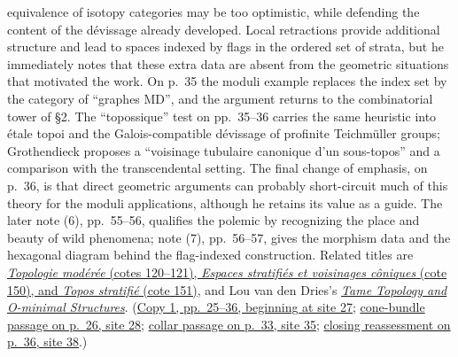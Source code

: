 equivalence of isotopy categories may be too optimistic, while defending
the content of the dévissage already developed. Local retractions provide
additional structure and lead to spaces indexed by flags in the ordered
set of strata, but he immediately notes that these extra data are absent
from the geometric situations that motivated the work. On p.~35 the
moduli example replaces the index set by the category of ``graphes MD'',
and the argument returns to the combinatorial tower of \S2. The
``topossique'' test on pp.~35--36 carries the same heuristic into étale
topoi and the Galois-compatible dévissage of profinite Teichmüller groups;
Grothendieck proposes a ``voisinage tubulaire canonique d'un sous-topos''
and a comparison with the transcendental setting. The final change of
emphasis, on p.~36, is that direct geometric arguments can probably
short-circuit much of this theory for the moduli applications, although
he retains its value as a guide. The later note (6), pp.~55--56,
qualifies the polemic by recognizing the place and beauty of wild
phenomena; note (7), pp.~56--57, gives the morphism data and the hexagonal
diagram behind the flag-indexed construction. Related titles are
\href{https://grothendieck.umontpellier.fr/archives-grothendieck/}{\emph{Topologie modérée} (cotes 120--121), \emph{Espaces stratifiés et voisinages côniques} (cote 150), and \emph{Topos stratifié} (cote 151)},
and Lou van den Dries's
\href{https://assets.cambridge.org/97805215/98385/frontmatter/9780521598385_frontmatter.pdf}{\emph{Tame Topology and O-minimal Structures}}.
(\href{https://grothendieck.umontpellier.fr/web/viewer.html?file=../119.pdf\#page=28}{Copy 1, pp.~25--36, beginning at site 27};
\href{https://grothendieck.umontpellier.fr/web/viewer.html?file=../119.pdf\#page=29}{cone-bundle passage on p.~26, site 28};
\href{https://grothendieck.umontpellier.fr/web/viewer.html?file=../119.pdf\#page=36}{collar passage on p.~33, site 35};
\href{https://grothendieck.umontpellier.fr/web/viewer.html?file=../119.pdf\#page=39}{closing reassessment on p.~36, site 38}.)
